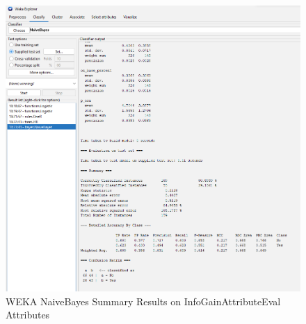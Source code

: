 \documentclass[12pt]{article}
\begin{document}
\begin{figure}[h!]
    \includegraphics[scale=0.4]{./images/InfoGainAttributeEval/NaiveBayes-Summary.png}
\centering
    \caption{WEKA NaiveBayes Summary Results on InfoGainAttributeEval Attributes}
\end{figure}

\newpage
\end{document}
